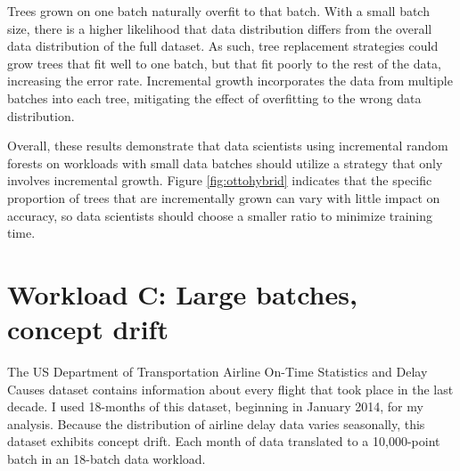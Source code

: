 Trees grown on one batch naturally overfit to that batch. With a small batch
size, there is a higher likelihood that data distribution differs from the
overall data distribution of the full dataset. As such, tree replacement
strategies could grow trees that fit well to one batch, but that fit poorly to
the rest of the data, increasing the error rate. Incremental growth
incorporates the data from multiple batches into each tree, mitigating the
effect of overfitting to the wrong data distribution.

Overall, these results demonstrate that data scientists using incremental
random forests on workloads with small data batches should utilize a strategy
that only involves incremental growth. Figure \ref{fig:ottohybrid} indicates
that the specific proportion of trees that are incrementally grown can vary
with little impact on accuracy, so data scientists should choose a smaller
ratio to minimize training time.

\section{Workload C: Large batches, concept drift}

The US Department of Transportation Airline On-Time Statistics and Delay Causes
dataset contains information about every flight that took place in the last
decade. I used 18-months of this dataset, beginning in January 2014, for my
analysis. Because the distribution of airline delay data varies seasonally,
this dataset exhibits concept drift. Each month of data translated to a
10,000-point batch in an 18-batch data workload. \cite{Plane}

